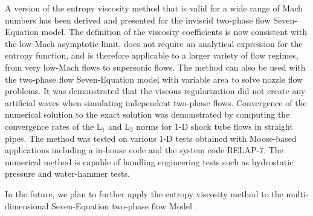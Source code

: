 \documentclass[preprint,10pt]{elsarticle}
\begin{document}
%
%
A version of the entropy viscosity method that is valid for a wide range of Mach numbers has been derived 
and presented for the inviscid two-phase flow Seven-Equation model.
The definition of the viscosity coefficients
is now consistent with the low-Mach asymptotic limit, does not require an analytical expression 
for the entropy function, and is therefore applicable to a larger variety of flow regimes, from very 
low-Mach flows to supersonic flows.
The method can also be used with the two-phase flow Seven-Equation model with variable area to solve nozzle flow problems.
It was demonstrated that the viscous regularization did not create any artificial waves when simulating independent two-phase flows.
Convergence of the numerical solution to the exact solution was demonstrated by computing the convergence rates of the L$_1$ and L$_2$ norms 
for $1$-D shock tube flows in straight pipes. The method was tested on various $1$-D tests obtained with Moose-based applications including a in-house code and the system code RELAP-7. The numerical method is capable of handling engineering tests such as hydrostatic pressure and water-hammer tests.


In the future, we plan to further apply the entropy viscosity method 
to the multi-dimensional Seven-Equation two-phase flow Model \cite{SEM}. 
%

\end{document}
